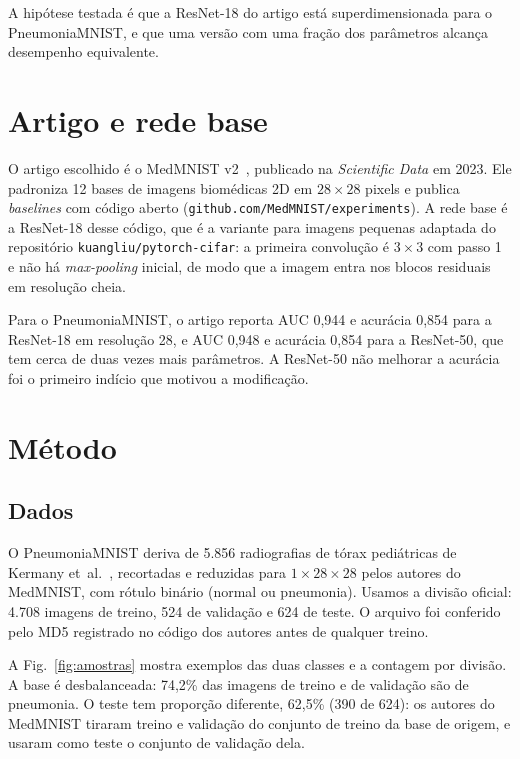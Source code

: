 \documentclass[runningheads]{llncs}
\begin{document}
A hipótese testada é que a ResNet-18 do artigo está superdimensionada
para o PneumoniaMNIST, e que uma versão com uma fração dos parâmetros
alcança desempenho equivalente.

\section{Artigo e rede base}

O artigo escolhido é o MedMNIST v2~\cite{medmnistv2}, publicado na
\textit{Scientific Data} em 2023. Ele padroniza 12 bases de imagens
biomédicas 2D em $28\times28$ pixels e publica \textit{baselines} com
código aberto (\texttt{github.com/MedMNIST/experiments}). A rede base é a
ResNet-18 desse código, que é a variante para imagens pequenas adaptada do
repositório \texttt{kuangliu/pytorch-cifar}: a primeira convolução é
$3\times3$ com passo 1 e não há \textit{max-pooling} inicial, de modo que
a imagem entra nos blocos residuais em resolução cheia.

Para o PneumoniaMNIST, o artigo reporta AUC 0,944 e acurácia 0,854 para a
ResNet-18 em resolução 28, e AUC 0,948 e acurácia 0,854 para a
ResNet-50, que tem cerca de duas vezes mais parâmetros. A ResNet-50
não melhorar a acurácia foi o primeiro indício que motivou a modificação.

\section{Método}

\subsection{Dados}

O PneumoniaMNIST deriva de 5.856 radiografias de tórax pediátricas de
Kermany et~al.~\cite{kermany2018}, recortadas e reduzidas para
$1\times28\times28$ pelos autores do MedMNIST, com rótulo binário
(normal ou pneumonia). Usamos a divisão oficial: 4.708 imagens de treino,
524 de validação e 624 de teste. O arquivo foi conferido pelo MD5
registrado no código dos autores antes de qualquer treino.

A Fig.~\ref{fig:amostras} mostra exemplos das duas classes e a contagem
por divisão. A base é desbalanceada: 74,2\% das imagens de treino e de
validação são de pneumonia. O teste tem proporção diferente, 62,5\%
(390 de 624): os autores do MedMNIST tiraram treino e validação do
conjunto de treino da base de origem, e usaram como teste o conjunto de
validação dela.
\end{document}
